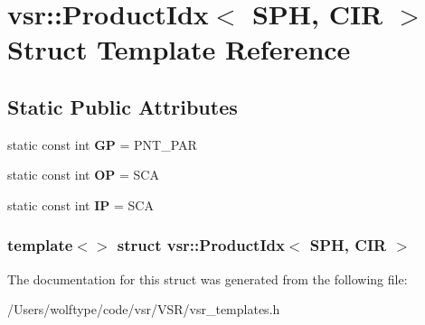 \hypertarget{structvsr_1_1_product_idx_3_01_s_p_h_00_01_c_i_r_01_4}{\section{vsr\-:\-:Product\-Idx$<$ S\-P\-H, C\-I\-R $>$ Struct Template Reference}
\label{structvsr_1_1_product_idx_3_01_s_p_h_00_01_c_i_r_01_4}
}
\subsection*{Static Public Attributes}
\begin{DoxyCompactItemize}
\item 
\hypertarget{structvsr_1_1_product_idx_3_01_s_p_h_00_01_c_i_r_01_4_abb35e91e2e66fe1c0ca207442d64b734}{static const int {\bfseries G\-P} = P\-N\-T\-\_\-\-P\-A\-R}\label{structvsr_1_1_product_idx_3_01_s_p_h_00_01_c_i_r_01_4_abb35e91e2e66fe1c0ca207442d64b734}

\item 
\hypertarget{structvsr_1_1_product_idx_3_01_s_p_h_00_01_c_i_r_01_4_abdbe8d8fb1a38d5b3e6ba77958a19f71}{static const int {\bfseries O\-P} = S\-C\-A}\label{structvsr_1_1_product_idx_3_01_s_p_h_00_01_c_i_r_01_4_abdbe8d8fb1a38d5b3e6ba77958a19f71}

\item 
\hypertarget{structvsr_1_1_product_idx_3_01_s_p_h_00_01_c_i_r_01_4_a6bf8d274afef09d5561080990b082dc9}{static const int {\bfseries I\-P} = S\-C\-A}\label{structvsr_1_1_product_idx_3_01_s_p_h_00_01_c_i_r_01_4_a6bf8d274afef09d5561080990b082dc9}

\end{DoxyCompactItemize}
\subsubsection*{template$<$$>$ struct vsr\-::\-Product\-Idx$<$ S\-P\-H, C\-I\-R $>$}



The documentation for this struct was generated from the following file\-:\begin{DoxyCompactItemize}
\item 
/\-Users/wolftype/code/vsr/\-V\-S\-R/vsr\-\_\-templates.\-h\end{DoxyCompactItemize}

